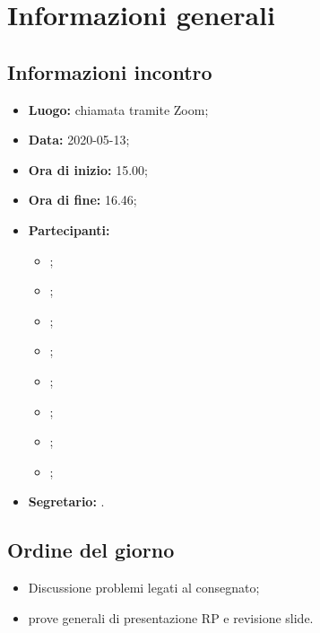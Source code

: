 \section{Informazioni generali}
\subsection{Informazioni incontro}
\begin{itemize}
	\item \textbf{Luogo:} chiamata tramite Zoom; 
	\item \textbf{Data:} 2020-05-13;
	\item \textbf{Ora di inizio:} 15.00; 
	\item \textbf{Ora di fine:} 16.46; 
	\item \textbf{Partecipanti:}
		\begin{itemize}
			\item \VB; 
			\item \LB; 
			\item \NF; 
			\item \EG; 
			\item \FJ; 
			\item \MP; 
			\item \AS; 
			\item \AZ; 
		\end{itemize}
	\item \textbf{Segretario:} \AS. 
\end{itemize}

\subsection{Ordine del giorno}
\begin{itemize}
	\item Discussione problemi legati al \PdP{} consegnato;
	\item prove generali di presentazione RP e revisione slide.
\end{itemize}
